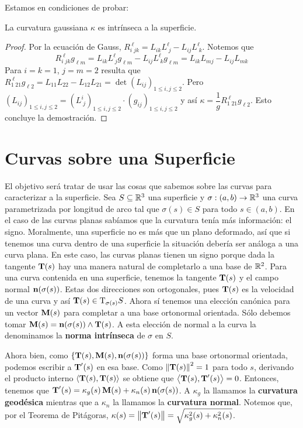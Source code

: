 Estamos en condiciones de probar:

\begin{teo}[Egregium]
La curvatura gaussiana $\kappa$ es intrínseca a la superficie.
\begin{proof}
Por la ecuación de Gauss, $R_{i\; jk}^{\;\ell} = L_{ik}L^{\ell}_{\; j} - L_{ij}L^{\ell}_{\; k}$. Notemos que $$R_{i\; jk}^{\;\ell}g_{\ell m} = L_{ik}L^{\ell}_{\; j}g_{\ell m} - L_{ij}L^{\ell}_{\; k}g_{\ell m} = L_{ik}L_{mj}-L_{ij}L_{mk}$$ Para $i=k=1$, $j=m=2$ resulta que $R_{1\; 21}^{\; \ell}g_{\ell 2} = L_{11}L_{22}-L_{12}L_{21} = \det (L_{ij})_{1\leq i,j\leq 2}$. Pero $(L_{ij})_{1\leq i,j\leq 2} = (L^{i}_{\; j})_{1\leq i,j\leq 2}\cdot (g_{ij})_{1\leq i,j\leq 2}$ y así $\kappa = \dfrac{1}{g}R_{1\; 21}^{\;\ell}g_{\ell 2}$. Esto concluye la demostración.
\end{proof}
\end{teo}

\section{Curvas sobre una Superficie}

El objetivo será tratar de usar las cosas que sabemos sobre las curvas para caracterizar a la superficie. Sea $S\subseteq\mathbb{R}^3$ una superficie y $\sigma:(a,b)\to\mathbb{R}^3$ una curva parametrizada por longitud de arco tal que $\sigma(s)\in S$ para todo $s\in (a,b)$. En el caso de las curvas planas sabíamos que la curvatura tenía más información: el signo. Moralmente, una superficie no es más que un plano deformado, así que si tenemos una curva dentro de una superficie la situación debería ser análoga a una curva plana. En este caso, las curvas planas tienen un signo porque dada la tangente $\operatorname{\mathbf{T}}(s)$ hay una manera natural de completarlo a una base de $\mathbb{R}^2$. Para una curva contenida en una superficie, tenemos la tangente $\operatorname{\mathbf{T}}(s)$ y el campo normal $\operatorname{\mathbf{n}}(\sigma(s))$. Estas dos direcciones son ortogonales, pues $\operatorname{\mathbf{T}}(s)$ es la velocidad de una curva y así $\operatorname{\mathbf{T}}(s)\in\mathrm{T}_{\sigma(s)}S$. Ahora sí tenemos una elección canónica para un vector $\operatorname{\mathbf{M}}(s)$ para completar a una base ortonormal orientada. Sólo debemos tomar $\operatorname{\mathbf{M}}(s)=\operatorname{\mathbf{n}}(\sigma(s))\wedge\operatorname{\mathbf{T}}(s)$. A esta elección de normal a la curva la denominamos la \textbf{norma intrínseca} de $\sigma$ en $S$.

Ahora bien, como $\{\operatorname{\mathbf{T}}(s),\operatorname{\mathbf{M}}(s),\operatorname{\mathbf{n}}(\sigma(s))\}$ forma una base ortonormal orientada, podemos escribir a $\operatorname{\mathbf{T}}'(s)$ en esa base. Como $\left\| \operatorname{\mathbf{T}}(s) \right\|^2=1$ para todo $s$, derivando el producto interno $\left\langle \operatorname{\mathbf{T}}(s),\operatorname{\mathbf{T}}(s) \right\rangle$ se obtiene que $\left\langle \operatorname{\mathbf{T}}(s),\operatorname{\mathbf{T}}'(s) \right\rangle=0$. Entonces, tenemos que $\operatorname{\mathbf{T}}'(s)=\kappa_g(s)\operatorname{\mathbf{M}}(s) + \kappa_n(s)\operatorname{\mathbf{n}}(\sigma(s))$. A $\kappa_g$ la llamamos la \textbf{curvatura geodésica} mientras que a $\kappa_n$ la llamamos la \textbf{curvatura normal}. Notemos que, por el Teorema de Pitágoras, $\kappa(s)=\left\| \operatorname{\mathbf{T}}'(s) \right\| = \sqrt{\kappa_g^2(s) + \kappa_n^2(s)}$. 

